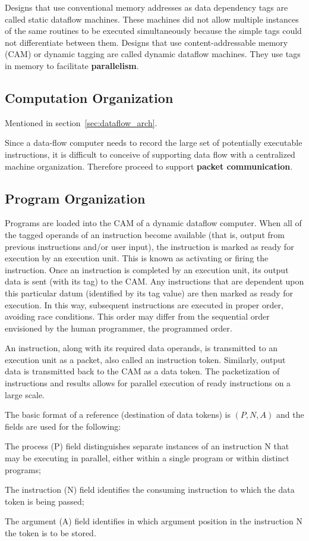 \documentclass[UTF8]{article}
\begin{document}
Designs that use conventional memory addresses as data dependency tags are called static dataflow machines.
These machines did not allow multiple instances of the same routines to be executed simultaneously
because the simple tags could not differentiate between them.
Designs that use content-addressable memory (CAM) or dynamic tagging are called dynamic dataflow machines.
They use tags in memory to facilitate \textbf{parallelism}.

\subsection{Computation Organization}
Mentioned in section~\ref{sec:dataflow_arch}.

Since a data-flow computer needs to record
the large set of potentially executable instructions,
it is difficult to conceive of supporting
data flow with a centralized machine organization.
Therefore proceed to support \textbf{packet communication}.

\subsection{Program Organization}

Programs are loaded into the CAM of a dynamic dataflow computer.
When all of the tagged operands of an instruction become available (that is, output from previous instructions and/or user input),
the instruction is marked as ready for execution by an execution unit.
This is known as activating or firing the instruction.
Once an instruction is completed by an execution unit,
its output data is sent (with its tag) to the CAM.
Any instructions that are dependent upon this particular datum (identified by its tag value)
are then marked as ready for execution.
In this way, subsequent instructions are executed in proper order, avoiding race conditions.
This order may differ from the sequential order envisioned by the human programmer, the programmed order.

An instruction, along with its required data operands,
is transmitted to an execution unit as a packet, also called an instruction token.
Similarly, output data is transmitted back to the CAM as a data token.
The packetization of instructions and results allows for parallel execution of ready instructions on a large scale.

The basic format of a reference (destination of data tokens) is $(P, N, A)$
and the fields are used for the following:
\begin{compactitem}
  \item The process (P) field distinguishes separate instances
        of an instruction N that may be executing in parallel,
        either within a single program or within distinct programs;
  \item The instruction (N) field identifies the consuming instruction
        to which the data token is being passed;
  \item The argument (A) field identifies in which
        argument position in the instruction N the token is to be stored. 
\end{compactitem}
\end{document}
